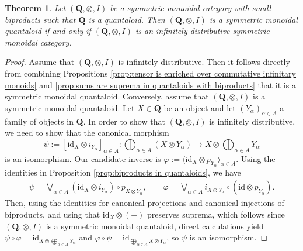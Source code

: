 \documentclass[12pt]{tac}
\newtheorem{theorem}{Theorem}[section]
\theoremstyle{definition}
\theoremstyle{remark}
\newcommand{\<}{\langle}
\renewcommand{\>}{\rangle}
\renewcommand{\:}{\colon}
\newcommand{\id}{\mathrm{id}}
\begin{document}
\begin{theorem}\label{thm:distributive symmetric monoidal quantaloid}
    Let $(\mathbf Q,\otimes,I)$ be a symmetric monoidal category with small biproducts such that $\mathbf Q$ is a quantaloid. Then $(\mathbf Q,\otimes,I)$ is a symmetric monoidal quantaloid if and only if $(\mathbf Q,\otimes,I)$ is an infinitely distributive symmetric monoidal category. 
\end{theorem}
\begin{proof}
Assume that $(\mathbf Q,\otimes,I)$ is infinitely distributive. Then it follows directly from combining Propositions \ref{prop:tensor is enriched over commutative infinitary monoids} and \ref{prop:sums are suprema in quantaloids with biproducts} that it is a symmetric monoidal quantaloid. Conversely, assume that $(\mathbf Q,\otimes,I)$ is a symmetric monoidal quantaloid.
Let $X\in\mathbf Q$ be an object and let $(Y_\alpha)_{\alpha\in A}$ a family of objects in $\mathbf Q$. In order to show that $(\mathbf Q,\otimes,I)$ is infinitely distributive, we need to show that the canonical morphism
\[ \psi:=[\id_X\otimes i_{Y_\alpha}]_{\alpha\in A}:\bigoplus_{\alpha\in A}(X\otimes Y_\alpha)\to X\otimes\bigoplus_{\alpha\in A}Y_\alpha\]
is an isomorphism. Our candidate inverse is $\varphi:=\langle \id_X\otimes p_{Y_\alpha}\rangle_{\alpha\in A}$.
Using the identities in Proposition \ref{prop:biproducts in quantaloids}, we have
\begin{align*}
    \psi = \bigvee_{\alpha\in A}(\id_X\otimes i_{Y_\alpha})\circ p_{X\otimes Y_\alpha},\qquad \varphi  = \bigvee_{\alpha\in A}i_{X\otimes Y_\alpha}\circ (\id\otimes p_{Y_\alpha}).
\end{align*}
Then, using the identities for canonical projections and canonical injections of biproducts, and using that $\id_X\otimes(-)$ preserves suprema, which follows since $(\mathbf Q,\otimes,I)$ is a symmetric monoidal quantaloid, direct calculations yield $
    \psi\circ\varphi =\id_{X\otimes\bigoplus_{\alpha\in A}Y_\alpha}$ and $
    \varphi\circ\psi = \id_{\bigoplus_{\alpha\in A}X\otimes Y_\alpha}$, so  $\psi$ is an isomorphism.
\end{proof}
\end{document}
